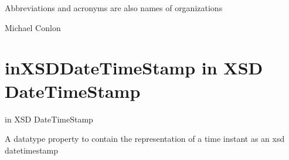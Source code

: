 \documentclass[letterpaper,10pt,english]{sphinxmanual}
\begin{document}
\begin{sphinxShadowBox}

\sphinxAtStartPar
Abbreviations and acronyms are also names of organizations
\end{sphinxShadowBox}

\begin{sphinxShadowBox}

\sphinxAtStartPar
{}
\end{sphinxShadowBox}

\begin{sphinxShadowBox}

\sphinxAtStartPar
Michael Conlon 
\end{sphinxShadowBox}
\begin{quote}

\ignorespaces \end{quote}


\section{inXSDDateTimeStamp \sphinxhyphen{} in XSD Date\sphinxhyphen{}Time\sphinxhyphen{}Stamp}
\label{\detokenize{doc-inXSDDateTimeStamp:inxsddatetimestamp-in-xsd-date-time-stamp}}\label{\detokenize{doc-inXSDDateTimeStamp:index-0}}\label{\detokenize{doc-inXSDDateTimeStamp::doc}}
\begin{sphinxShadowBox}

\sphinxAtStartPar
in XSD Date\sphinxhyphen{}Time\sphinxhyphen{}Stamp
\end{sphinxShadowBox}

\begin{sphinxShadowBox}

\sphinxAtStartPar
{}
\end{sphinxShadowBox}

\begin{sphinxShadowBox}

\sphinxAtStartPar
A datatype property to contain the representation of a time instant as an xsd datetimestamp
\end{sphinxShadowBox}
\end{document}
